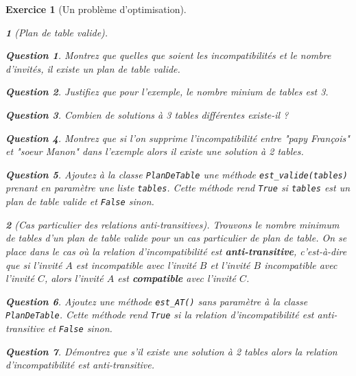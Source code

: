 \documentclass{article}
\theoremstyle{exostyle}
\newtheorem{exo}{Exercice}
\theoremstyle{partiestyle}
\newtheorem{partie}{}[exo]
\theoremstyle{questionstyle}
\newtheorem{questionpartie}{Question}[partie]
\begin{document}
\begin{exo}[Un problème d'optimisation]
\begin{partie}[Plan de table valide]
\begin{questionpartie} 
Montrez que quelles que soient les incompatibilités et le nombre d'invités, il existe un plan de table valide.
\end{questionpartie}

\begin{questionpartie} 
Justifiez que pour l'exemple, le nombre minium de tables est 3.
\end{questionpartie}

\begin{questionpartie} 
Combien de solutions à 3 tables différentes existe-il ?
\end{questionpartie}

\begin{questionpartie} 
Montrez que si l'on supprime l'incompatibilité entre {\it "papy François"} et {\it "soeur Manon"} dans l'exemple alors il existe une solution à 2 tables.
\end{questionpartie}

\begin{questionpartie}
Ajoutez à la classe \verb+PlanDeTable+ une méthode \verb|est_valide(tables)| prenant en paramètre une liste \verb|tables|. Cette méthode rend \verb|True| si \verb|tables| est un plan de table valide et \verb|False| sinon.
\end{questionpartie}

\end{partie}

\begin{partie}[Cas particulier des relations anti-transitives]

Trouvons le nombre minimum de tables d'un plan de table valide pour un cas particulier de plan de table.
On se place dans le cas où la relation d'incompatibilité est {\em \bf anti-transitive}, c'est-à-dire que si l'invité $A$ est incompatible avec l'invité $B$ et l'invité $B$ incompatible avec l'invité $C$, alors l'invité $A$ est {\bf compatible} avec l'invité $C$.

\begin{questionpartie}
Ajoutez une méthode \verb|est_AT()| sans paramètre à la classe \verb+PlanDeTable+. Cette méthode rend \verb|True| si la relation d'incompatibilité est anti-transitive et \verb|False| sinon.
\end{questionpartie}

\begin{questionpartie}
Démontrez que s'il existe une solution à 2 tables alors la relation d'incompatibilité est anti-transitive.
\end{questionpartie}


\end{partie}
\end{exo}
\end{document}
